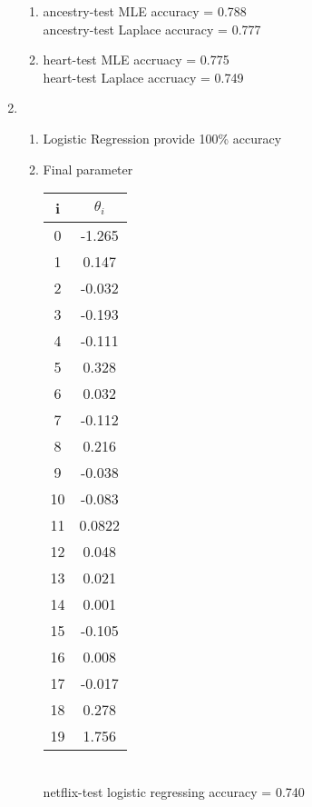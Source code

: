 \documentclass{article}
\begin{document}
\begin{enumerate}
\begin{enumerate}
		\item 
		ancestry-test MLE accuracy = 0.788\\
		ancestry-test Laplace accuracy = 0.777\\
		\item 
		heart-test MLE accruacy = 0.775\\
		heart-test Laplace accruacy = 0.749 \\
		
	\end{enumerate}
	\item
	\begin{enumerate}
		\item
		Logistic Regression provide 100\% accuracy
		\item
		Final parameter\\
		\begin{tabular}{|c|c|}
			\hline
			i & $\theta_i$\\
			\hline
			0 & -1.265\\
			1 & 0.147\\
			2 & -0.032\\
			3 & -0.193\\
			4 & -0.111\\
			5 & 0.328\\
			6 & 0.032\\
			7 & -0.112\\
			8 & 0.216\\
			9 & -0.038\\
			10 & -0.083\\
			11 & 0.0822\\
			12 & 0.048\\
			13 & 0.021\\
			14 & 0.001\\
			15 & -0.105\\
			16 & 0.008\\
			17 & -0.017\\
			18 & 0.278\\
			19 & 1.756\\
			\hline
		\end{tabular}\\

		netflix-test logistic regressing accuracy = 0.740\\


\end{enumerate}
\end{enumerate}
\end{document}
